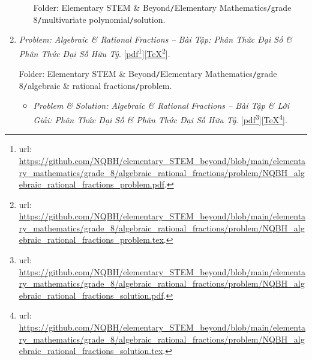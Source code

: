 \documentclass[12pt,twoside]{book}
\begin{document}
\begin{enumerate}
\begin{itemize}
		Folder: {\sf Elementary STEM \& Beyond{\tt/}Elementary Mathematics{\tt/}grade 8{\tt/}multivariate polynomial{\tt/}solution}.
	\end{itemize}
	\item {\it Problem: Algebraic \& Rational Fractions -- Bài Tập: Phân Thức Đại Số \& Phân Thức Đại Số Hữu Tỷ}. [\href{https://github.com/NQBH/elementary_STEM_beyond/blob/main/elementary_mathematics/grade_8/algebraic_rational_fractions/problem/NQBH_algebraic_rational_fractions_problem.pdf}{pdf}\footnote{{\sc url}: \url{https://github.com/NQBH/elementary_STEM_beyond/blob/main/elementary_mathematics/grade_8/algebraic_rational_fractions/problem/NQBH_algebraic_rational_fractions_problem.pdf}.}][\href{https://github.com/NQBH/elementary_STEM_beyond/blob/main/elementary_mathematics/grade_8/algebraic_rational_fractions/problem/NQBH_algebraic_rational_fractions_problem.tex}{\TeX}\footnote{{\sc url}: \url{https://github.com/NQBH/elementary_STEM_beyond/blob/main/elementary_mathematics/grade_8/algebraic_rational_fractions/problem/NQBH_algebraic_rational_fractions_problem.tex}.}].
	
	Folder: {\sf Elementary STEM \& Beyond{\tt/}Elementary Mathematics{\tt/}grade 8{\tt/}algebraic \& rational fractions{\tt/}problem}.
	\begin{itemize}
		\item {\it Problem \& Solution: Algebraic \& Rational Fractions -- Bài Tập \& Lời Giải: Phân Thức Đại Số \& Phân Thức Đại Số Hữu Tỷ}. [\href{https://github.com/NQBH/elementary_STEM_beyond/blob/main/elementary_mathematics/grade_8/algebraic_rational_fractions/problem/NQBH_algebraic_rational_fractions_solution.pdf}{pdf}\footnote{{\sc url}: \url{https://github.com/NQBH/elementary_STEM_beyond/blob/main/elementary_mathematics/grade_8/algebraic_rational_fractions/problem/NQBH_algebraic_rational_fractions_solution.pdf}.}][\href{https://github.com/NQBH/elementary_STEM_beyond/blob/main/elementary_mathematics/grade_8/algebraic_rational_fractions/problem/NQBH_algebraic_rational_fractions_solution.tex}{\TeX}\footnote{{\sc url}: \url{https://github.com/NQBH/elementary_STEM_beyond/blob/main/elementary_mathematics/grade_8/algebraic_rational_fractions/problem/NQBH_algebraic_rational_fractions_solution.tex}.}].
		

\end{itemize}
\end{enumerate}
\end{document}
